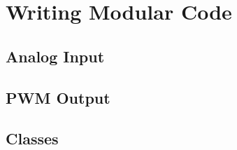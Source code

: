 \section{Writing Modular Code}
\label{sec:modular_code}

\subsection{Analog Input}
\label{sub:analog_input}


\subsection{PWM Output}
\label{sub:pwm_output}


\subsection{Classes}
\label{sub:classes}
